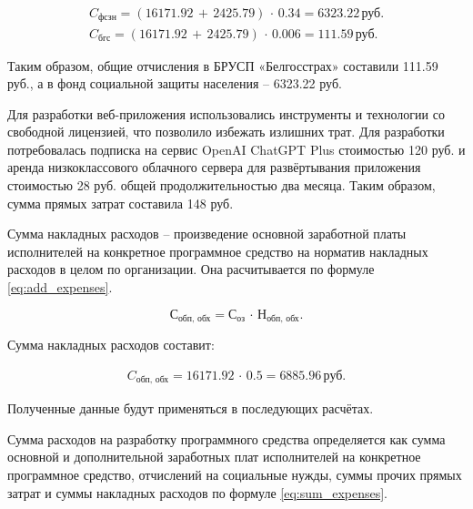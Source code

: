 \begin{gather*}
  C_{\text{фсзн}} = (16171.92\,+\,2425.79)\,\cdot\,0.34 = 6323.22\,\text{руб.}\\
  C_{\text{бгс}} = (16171.92\,+\,2425.79)\,\cdot\,0.006 = 111.59\,\text{руб.}
\end{gather*}

Таким образом, общие отчисления в БРУСП «Белгосстрах» составили 111.59
руб., а в фонд социальной защиты населения -- 6323.22 руб.


Для разработки веб-приложения использовались инструменты и технологии со свободной лицензией, что позволило избежать излишних трат. Для разработки потребовалась подписка на сервис OpenAI ChatGPT Plus стоимостью 120 руб. и аренда низкоклассового облачного сервера для развёртывания приложения стоимостью 28 руб. общей продолжительностью два месяца. Таким образом, сумма прямых затрат составила 148 руб.


Сумма накладных расходов -- произведение основной заработной платы исполнителей на конкретное программное средство на норматив накладных расходов в целом по организации. Она расчитывается по формуле \ref{eq:add_expenses}.

\noindent
\begin{minipage}{1\linewidth}
\begin{equation}\label{eq:add_expenses}
  \text{С}_\text{обп, обх} = \text{С}_\text{оз}\,\cdot\,\text{Н}_\text{обп, обх}\text{.}
\end{equation}
\vspace{-10pt}
\end{minipage}

Сумма накладных расходов составит:

\begin{gather*}
  C_{\text{обп, обх}} = 16171.92\,\cdot\,0.5 = 6885.96\,\text{руб.}
\end{gather*}

Полученные данные будут применяться в последующих расчётах.


Сумма расходов на разработку программного средства определяется как сумма основной и дополнительной заработных плат исполнителей на конкретное программное средство, отчислений на социальные нужды, суммы прочих прямых затрат и суммы накладных расходов по формуле \ref{eq:sum_expenses}.

